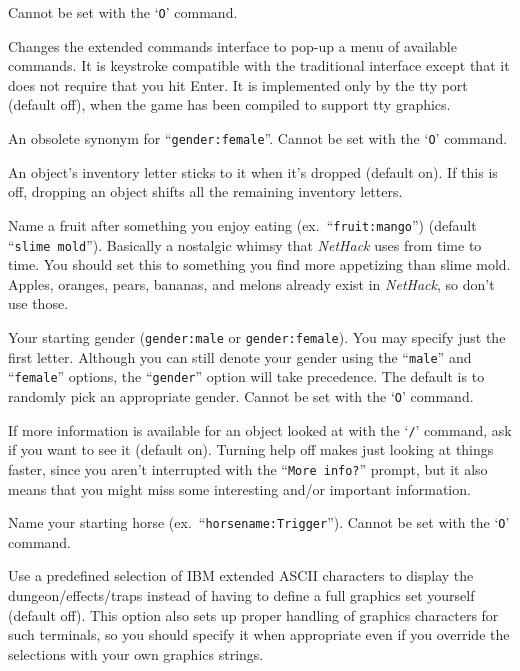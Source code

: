 Cannot be set with the `{\tt O}' command.
\item[\ib{extmenu}]
Changes the extended commands interface to pop-up a menu of available commands.
It is keystroke compatible with the traditional interface except that it does
not require that you hit Enter.  It is implemented only by the tty port 
(default off), when the game has been compiled to support tty graphics.
\item[\ib{female}]
An obsolete synonym for ``{\tt gender:female}''.  Cannot be set with the
`{\tt O}' command.
\item[\ib{fixinv}]
An object's inventory letter sticks to it when it's dropped (default on).
If this is off, dropping an object shifts all the remaining inventory letters.
\item[\ib{fruit}]
Name a fruit after something you enjoy eating (ex.\ ``{\tt fruit:mango}'')
(default ``{\tt slime mold}''). Basically a nostalgic whimsy that
{\it NetHack\/} uses from time to time.  You should set this to something you
find more appetizing than slime mold.  Apples, oranges, pears, bananas, and
melons already exist in {\it NetHack}, so don't use those.
\item[\ib{gender}]
Your starting gender ({\tt gender:male} or {\tt gender:female}).
You may specify just the first letter.  Although you can
still denote your gender using the ``{\tt male}'' and ``{\tt female}''
options, the ``{\tt gender}'' option will take precedence.
The default is to randomly pick an appropriate gender.
Cannot be set with the `{\tt O}' command.
\item[\ib{help}]
If more information is available for an object looked at
with the `{\tt /}' command, ask if you want to see it (default on).
Turning help off makes just looking at things faster, since you aren't
interrupted with the ``{\tt More info?}'' prompt, but it also means that you
might miss some interesting and/or important information.
\item[\ib{horsename}]
Name your starting horse (ex.\ ``{\tt horsename:Trigger}'').
Cannot be set with the `{\tt O}' command.
\item[\ib{IBMgraphics}]
Use a predefined selection of IBM extended ASCII characters to display the
dungeon/effects/traps instead of having to define a full graphics set
yourself (default off).
This option also sets up proper handling of graphics
characters for such terminals, so you should specify it when appropriate
even if you override the selections with your own graphics strings.
